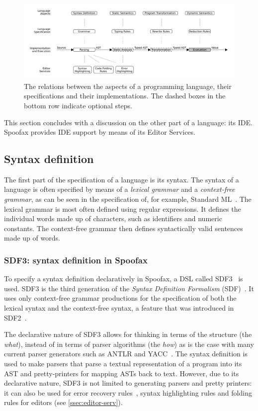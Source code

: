 \begin{figure}[t]
  \centering
  \includegraphics[width=\textwidth]{spoofax-relations}
  \caption{The relations between the aspects of a programming language, their
    specifications and their implementations. The dashed boxes in the bottom row
    indicate optional steps.}
  \label{fig:spoofax-relations}
\end{figure}

This section concludes with a discussion on the other part of a language: its
IDE. Spoofax provides IDE support by means of its Editor Services.

\subsection{Syntax definition}
\label{ssec:syntax-def}
The first part of the specification of a language is its syntax. The
syntax of a language is often specified by means of a \emph{lexical
grammar} and a \emph{context-free grammar}, as can be seen in the
specification of, for example, Standard ML~\cite{Milner97}. The
lexical grammar is most often defined using regular expressions. It
defines the individual words made up of characters, such as
identifiers and numeric constants. The context-free grammar then
defines syntactically valid sentences made up of words.

\subsubsection{SDF3: syntax definition in Spoofax}
\label{ssec:orgheadline1}
To specify a syntax definition declaratively in Spoofax, a DSL called
SDF3~\cite{Vollebregt12} is used.  SDF3 is the third generation
of the \emph{Syntax Definition Formalism} (SDF)~\cite{Heering89}. It
uses only context-free grammar productions for the specification of
both the lexical syntax and the context-free syntax, a feature that
was introduced in SDF2~\cite{Visser97}.

The declarative nature of SDF3 allows for thinking in terms of the
structure (the \emph{what}), instead of in terms of parser algorithms (the
\emph{how}) as is the case with many current parser generators such as
ANTLR and YACC~\cite{Kats10b}. The syntax definition is used to
make parsers that parse a textual representation of a program into its
AST and pretty-printers for mapping ASTs back to text. However, due to
its declarative nature, SDF3 is not limited to generating parsers and
pretty printers: it can also be used for error recovery
rules~\cite{deJonge12}, syntax highlighting rules and folding
rules for editors (see \cref{ssec:editor-serv}).

